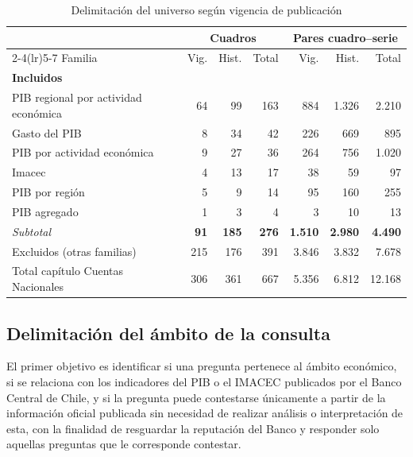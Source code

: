 \documentclass[11pt]{article}
\begin{document}
\begin{table}[htbp]
\centering
\caption{Delimitación del universo según vigencia de publicación}
\label{tab:delimitacion}
\small
\begin{tabular}{l rrr rrr}
\toprule
& \multicolumn{3}{c}{Cuadros} & \multicolumn{3}{c}{Pares cuadro--serie} \\
\cmidrule(lr){2-4}\cmidrule(lr){5-7}
Familia & Vig. & Hist. & Total & Vig. & Hist. & Total \\
\midrule
\multicolumn{7}{l}{\textbf{Incluidos}} \\
\addlinespace[2pt]
\quad PIB regional por actividad económica  &  64 &  99 & 163 &  884 & 1.326 & 2.210 \\
\quad Gasto del PIB                         &   8 &  34 &  42 &  226 &   669 &   895 \\
\quad PIB por actividad económica           &   9 &  27 &  36 &  264 &   756 & 1.020 \\
\quad Imacec                                &   4 &  13 &  17 &   38 &    59 &    97 \\
\quad PIB por región                        &   5 &   9 &  14 &   95 &   160 &   255 \\
\quad PIB agregado                          &   1 &   3 &   4 &    3 &    10 &    13 \\
\addlinespace[2pt]
\quad \emph{Subtotal} & \textbf{91} & \textbf{185} & \textbf{276} & \textbf{1.510} & \textbf{2.980} & \textbf{4.490} \\
\addlinespace[5pt]
\quad Excluidos (otras familias)           & 215 & 176 & 391 & 3.846 & 3.832 & 7.678 \\
\midrule
Total capítulo Cuentas Nacionales & 306 & 361 & 667 & 5.356 & 6.812 & 12.168 \\
\bottomrule
\end{tabular}
\end{table}

\subsection{Delimitación del ámbito de la consulta}
\label{sec:delimitacion}

El primer objetivo es identificar si una pregunta pertenece al ámbito económico, si
se relaciona con los indicadores del PIB o el IMACEC publicados por el Banco Central
de Chile, y si la pregunta puede contestarse únicamente a partir de la información
oficial publicada sin necesidad de realizar análisis o interpretación de esta, con la
finalidad de resguardar la reputación del Banco y responder solo aquellas preguntas
que le corresponde contestar.
\end{document}
